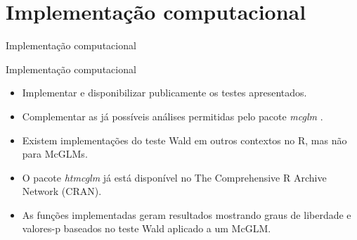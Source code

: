 \documentclass[
  ignorenonframetext,
  serif,
  professionalfont,
  usenames,
  dvipsnames,
  aspectratio = 169]{beamer}
\begin{document}
\hypertarget{implementauxe7uxe3o-computacional}{%
\section{Implementação
computacional}\label{implementauxe7uxe3o-computacional}}

\begin{frame}{Implementação computacional}
\end{frame}

\begin{frame}{Implementação computacional}
\protect\hypertarget{implementauxe7uxe3o-computacional-1}{}
\begin{itemize}
  \itemsep 2ex
  
  \item Implementar e disponibilizar publicamente os testes apresentados.

  \item Complementar as já possíveis análises permitidas pelo pacote \emph{mcglm} \citep{mcglm}.

  \item Existem implementações do teste Wald em outros contextos no R, mas não para McGLMs.

  \item O pacote \emph{htmcglm} já está disponível no The Comprehensive R Archive Network (CRAN).

  \item As funções implementadas geram resultados mostrando graus de liberdade e valores-p baseados no teste Wald aplicado a um McGLM.
\end{itemize}
\end{frame}
\end{document}
